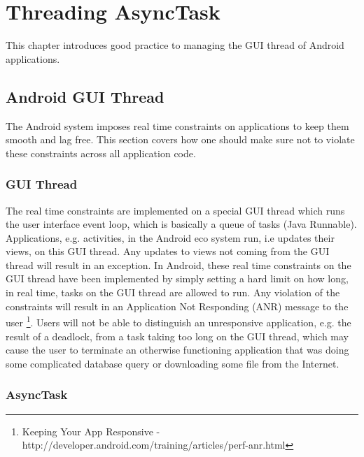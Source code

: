 \chapter{Threading AsyncTask}
\label{app:threading_asynctask}

This chapter introduces good practice to managing the GUI thread of Android applications.  

\section{Android GUI Thread}
\label{sec:gui_thread_async_task}

The Android system imposes real time constraints on applications to keep them smooth and lag free. This section covers how one should make sure not to violate these constraints across all application code.

\subsection{GUI Thread}

The real time constraints are implemented on a special GUI thread which runs the user interface event loop, which is basically a queue of tasks (Java Runnable). Applications, e.g. activities, in the Android eco system run, i.e updates their views, on this GUI thread. Any updates to views not coming from the GUI thread will result in an exception. In Android, these real time constraints on the GUI thread have been implemented by simply setting a hard limit on how long, in real time, tasks on the GUI thread are allowed to run. Any violation of the constraints will result in an Application Not Responding (ANR) message to the user \footnote{Keeping Your App Responsive - http://developer.android.com/training/articles/perf-anr.html}. Users will not be able to distinguish an unresponsive application, e.g. the result of a deadlock, from a task taking too long on the GUI thread, which may cause the user to terminate an otherwise functioning application that was doing some complicated database query or downloading some file from the Internet. 

\subsection{AsyncTask}

